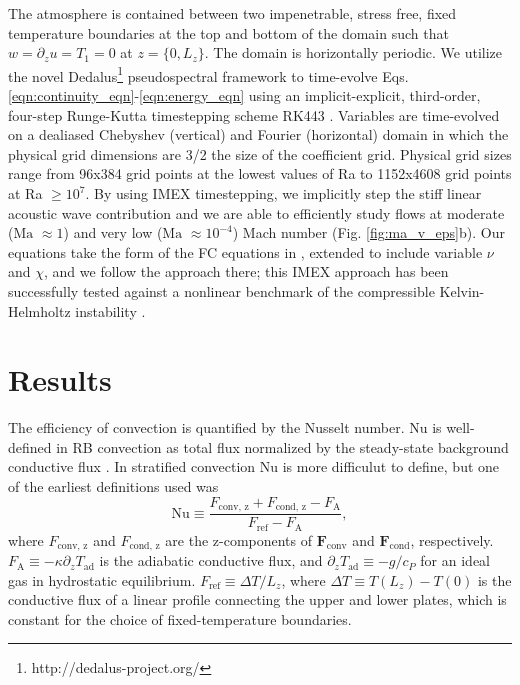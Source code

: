 \documentclass[aps, prl, twocolumn, nofootinbib, groupedaddress, amsfonts, amssymb, amsmath]{revtex4-1}
\begin{document}
The atmosphere is contained between two impenetrable, stress free, fixed temperature boundaries at
the top and bottom of the domain such that $w = \partial_z u = T_1 = 0$ at $z = \{0, L_z\}$. The domain
is horizontally periodic. We utilize the novel Dedalus\footnote{http://dedalus-project.org/} pseudospectral framework 
 to time-evolve Eqs. 
\ref{eqn:continuity_eqn}-\ref{eqn:energy_eqn} using an implicit-explicit, third-order, four-step 
Runge-Kutta timestepping scheme RK443 \cite{ascher&all1997}.  
Variables are time-evolved on a dealiased Chebyshev (vertical)
and Fourier (horizontal) domain in which the
physical grid dimensions are 3/2 the size of the coefficient grid.  Physical grid sizes range from
96x384 grid points at the lowest values of Ra to 1152x4608 grid points at Ra $\geq 10^{7}$. 
By using IMEX timestepping, we implicitly step the stiff linear acoustic wave contribution and we are able to
efficiently study flows at moderate ($\text{Ma } \approx 1$) and very low ($\text{Ma } \approx 10^{-4}$)
Mach number (Fig. \ref{fig:ma_v_eps}b).  Our equations take the form
of the FC equations in \cite{lecoanet&all2014}, extended to include variable
$\nu$ and $\chi$, and we follow the approach there; this IMEX approach has been successfully 
tested against a nonlinear benchmark  of the compressible Kelvin-Helmholtz instability \cite{Lecoanet_et_al_2016_KH}.

\section{Results}
\label{sec:results}

The efficiency of convection is quantified by the Nusselt number.  
Nu is well-defined in RB convection
as total flux normalized by the steady-state background conductive flux 
\cite{johnston&doering2009, otero&all2002}.
In stratified convection Nu is more difficulut to define, but one of the earliest definitions used
was \cite{graham1975,hurlburt&all1984}
\begin{equation}
\text{Nu} \equiv \frac{F_{\text{conv, z}} + F_{\text{cond, z}} - F_{\text{A}}}{F_{\text{ref}} - F_{\text{A}}},
\label{eqn:nusselt}
\end{equation}
where $F_{\text{conv, z}}$ and $F_{\text{cond, z}}$ are the z-components of $\bm{F}_{\text{conv}}$ and $\bm{F}_{\text{cond}}$,
respectively.  $F_{\text{A}} \equiv -\kappa \partial_z T_{\text{ad}}$ is the adiabatic conductive flux, and
$\partial_z T_{\text{ad}} \equiv - g / c_{P}$ for an ideal gas in hydrostatic equilibrium.
$F_{\text{ref}} \equiv \Delta T / L_z$, where $\Delta T \equiv T(L_z) - T(0)$ is the 
conductive flux of a linear profile connecting the upper
and lower plates, which is constant for the choice of fixed-temperature boundaries.
\end{document}
